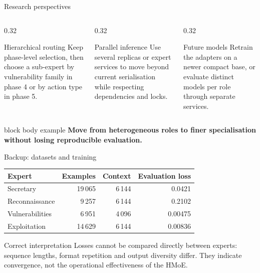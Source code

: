 \documentclass[aspectratio=169,10pt]{beamer}
\newcommand{\keymessage}[1]{%
  \begin{beamercolorbox}[rounded=true,sep=1.1ex,wd=\linewidth]{block body example}
    \centering\bfseries #1
  \end{beamercolorbox}
}
\begin{document}
\begin{frame}{Research perspectives}
  \begin{columns}[T,onlytextwidth]
    \begin{column}{0.32\textwidth}
      \begin{block}{Hierarchical routing}
        Keep phase-level selection, then choose a sub-expert by vulnerability
        family in phase 4 or by action type in phase 5.
      \end{block}
    \end{column}
    \begin{column}{0.32\textwidth}
      \begin{block}{Parallel inference}
        Use several replicas or expert services to move beyond current
        serialisation while respecting dependencies and locks.
      \end{block}
    \end{column}
    \begin{column}{0.32\textwidth}
      \begin{block}{Future models}
        Retrain the adapters on a newer compact base, or evaluate distinct models
        per role through separate services.
      \end{block}
    \end{column}
  \end{columns}

  \vfill
  \keymessage{Move from heterogeneous roles to finer specialisation without losing reproducible evaluation.}
\end{frame}

\appendix

\begin{frame}{Backup: datasets and training}
  \centering
  \small
  \begin{tabular}{lrrr}
    \toprule
    Expert & Examples & Context & Evaluation loss \\
    \midrule
    Secretary & 19\,065 & 6\,144 & 0.0421 \\
    Reconnaissance & 9\,257 & 6\,144 & 0.2102 \\
    Vulnerabilities & 6\,951 & 4\,096 & 0.00475 \\
    Exploitation & 14\,629 & 6\,144 & 0.00836 \\
    \bottomrule
  \end{tabular}

  \vspace{1em}
  \begin{alertblock}{Correct interpretation}
    Losses cannot be compared directly between experts: sequence lengths,
    format repetition and output diversity differ. They indicate convergence,
    not the operational effectiveness of the HMoE.
  \end{alertblock}
\end{frame}
\end{document}
